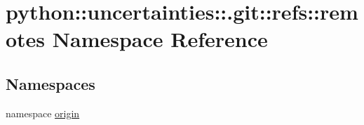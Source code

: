 \hypertarget{namespacepython_1_1uncertainties_1_1_8git_1_1refs_1_1remotes}{
\section{python::uncertainties::.git::refs::remotes Namespace Reference}
\label{namespacepython_1_1uncertainties_1_1_8git_1_1refs_1_1remotes}
}
\subsection*{Namespaces}
\begin{DoxyCompactItemize}
\item 
namespace \hyperlink{namespacepython_1_1uncertainties_1_1_8git_1_1refs_1_1remotes_1_1origin}{origin}
\end{DoxyCompactItemize}

